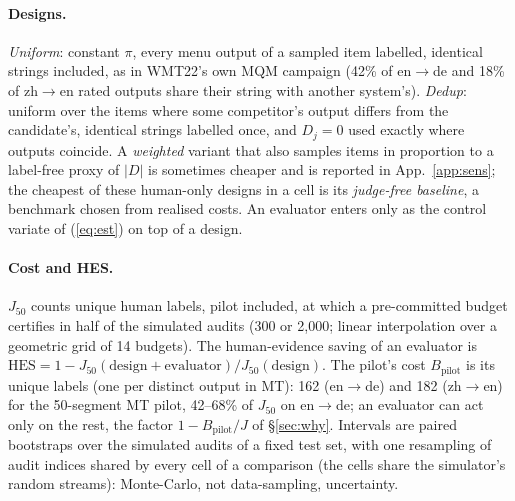 \documentclass[11pt]{article}
\newcommand{\HES}{\mathrm{HES}}
\newcommand{\Jt}{J_{50}}
\newcommand{\Bp}{B_{\mathrm{pilot}}}
\begin{document}
\paragraph{Designs.} \emph{Uniform}: constant $\pi$, every menu output of a sampled item labelled, identical strings
included, as in WMT22's own MQM campaign (42\% of en$\to$de and 18\% of zh$\to$en rated outputs share their string with
another system's). \emph{Dedup}: uniform over the items where some competitor's output differs from the candidate's,
identical strings labelled once, and $D_j=0$ used exactly where outputs coincide. A \emph{weighted} variant that also
samples items in proportion to a label-free proxy of $|D|$ is sometimes cheaper and is reported in App.~\ref{app:sens};
the cheapest of these human-only designs in a cell is its \emph{judge-free baseline}, a benchmark chosen from realised
costs. An evaluator enters only as the control variate of (\ref{eq:est}) on top of a design.

\paragraph{Cost and HES.} $\Jt$ counts unique human labels, pilot included, at which a pre-committed budget certifies
in half of the simulated audits (300 or 2,000; linear interpolation over a geometric grid of 14 budgets). The human-evidence
saving of an evaluator is $\HES=1-\Jt(\text{design}+\text{evaluator})/\Jt(\text{design})$. The pilot's cost $\Bp$
is its unique labels (one per distinct output in MT): 162 (en$\to$de) and 182 (zh$\to$en) for the 50-segment MT pilot,
42--68\% of $\Jt$ on en$\to$de; an evaluator can act only on the rest, the factor $1-\Bp/J$ of \S\ref{sec:why}. Intervals are paired bootstraps over the simulated audits of a fixed test
set, with one resampling of audit indices shared by every cell of a comparison (the cells share the simulator's random
streams): Monte-Carlo, not data-sampling, uncertainty.
\end{document}
